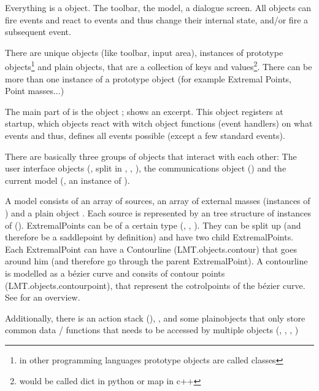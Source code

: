 Everything is a object. The toolbar, the model, a dialogue screen.
All objects can fire events and react to events and thus change their internal state, and/or fire a subsequent event.

There are unique objects (like toolbar, input area), instances of prototype objects\footnote{in other programming languages prototype objects are called classes} and plain objects, that are a collection of keys and values\footnote{would be called dict in python or map in c++}. There can be more than one instance of a prototype object (for example Extremal Points, Point masses...)

The main part of \spl is the object ;  shows an excerpt. This object registers at startup, which objects react with witch object functions (event handlers) on what events and thus,  defines all events possible (except a few standard events).


There are basically three groups of objects that interact with each other: The user interface objects (, split in , , ), the communications object () and the current model (, an instance of ).

A model consists of an array of sources, an array of external masses (instances of ) and a plain object .
Each source is represented by an tree structure of instances of  ().
ExtremalPoints can be of a certain type (, , ).
They can be split up (and therefore be a saddlepoint by definition) and have two child ExtremalPoints.
Each ExtremalPoint can have a Contourline (LMT.objects.contour) that goes around him (and therefore go through the parent ExtremalPoint).
A contourline is modelled as a bézier curve and consits of contour points (LMT.objects.contourpoint), that represent the cotrolpoints of the bézier curve. See  for an overview.

Additionally, there is an action stack (), , 
and some plainobjects that only store common data / functions that needs to be accessed by multiple objects (, , , )




